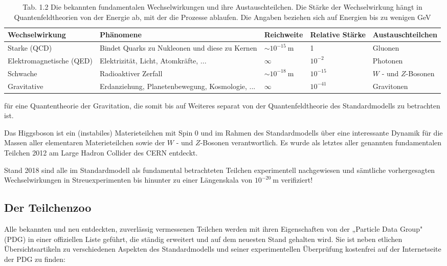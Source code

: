 \documentclass[10pt, letterpaper]{article}
\begin{document}
\begin{table}[h]
\begin{center}

\caption{Tab. 1.2 Die bekannten fundamentalen Wechselwirkungen und ihre Austauschteilchen. Die Stärke der Wechselwirkung hängt in Quantenfeldtheorien von der Energie ab, mit der die Prozesse ablaufen. Die Angaben beziehen sich auf Energien bis zu wenigen GeV}
\begin{tabular}{|l|l|l|l|l|}
\hline
Wechselwirkung & Phänomene & Reichweite & Relative Stärke & Austauschteilchen \\
\hline
Starke (QCD) & Bindet Quarks zu Nukleonen und diese zu Kernen & $\sim 10^{-15} \mathrm{~m}$ & 1 & Gluonen \\
\hline
Elektromagnetische (QED) & Elektrizität, Licht, Atomkräfte, ... & $\infty$ & $10^{-2}$ & Photonen \\
\hline
Schwache & Radioaktiver Zerfall & $\sim 10^{-18} \mathrm{~m}$ & $10^{-15}$ & $W$ - und $Z$-Bosonen \\
\hline
Gravitative & Erdanziehung, Planetenbewegung, Kosmologie, ... & $\infty$ & $10^{-41}$ & Gravitonen \\
\hline
\end{tabular}
\end{center}
\end{table}

für eine Quantentheorie der Gravitation, die somit bis auf Weiteres separat von der Quantenfeldtheorie des Standardmodells zu betrachten ist.

Das Higgsboson ist ein (instabiles) Materieteilchen mit Spin 0 und im Rahmen des Standardmodells über eine interessante Dynamik für die Massen aller elementaren Materieteilchen sowie der $W$ - und $Z$-Bosonen verantwortlich. Es wurde als letztes aller genannten fundamentalen Teilchen 2012 am Large Hadron Collider des CERN entdeckt.

Stand 2018 sind alle im Standardmodell als fundamental betrachteten Teilchen experimentell nachgewiesen und sämtliche vorhergesagten Wechselwirkungen in Streuexperimenten bis hinunter zu einer Längenskala von $10^{-20} \mathrm{~m}$ verifiziert!

\subsection{Der Teilchenzoo}
Alle bekannten und neu entdeckten, zuverlässig vermessenen Teilchen werden mit ihren Eigenschaften von der „Particle Data Group"(PDG) in einer offiziellen Liste geführt, die ständig erweitert und auf dem neuesten Stand gehalten wird. Sie ist neben etlichen Übersichtsartikeln zu verschiedenen Aspekten des Standardmodells und seiner experimentellen Überprüfung kostenfrei auf der Internetseite der PDG zu finden:
\end{document}
